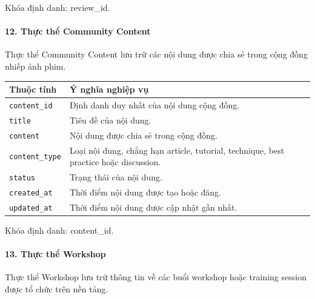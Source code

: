 Khóa định danh: review\_id.

\paragraph{12. Thực thể Community Content}\mbox{}\par

Thực thể Community Content lưu trữ các nội dung được chia sẻ trong cộng đồng nhiếp ảnh phim.

\begin{center}
\scriptsize
\begin{tabular}{p{.25\linewidth} p{.65\linewidth}}
\toprule
Thuộc tính & Ý nghĩa nghiệp vụ \\
\midrule
\texttt{content\_id} & Định danh duy nhất của nội dung cộng đồng. \\
\texttt{title} & Tiêu đề của nội dung. \\
\texttt{content} & Nội dung được chia sẻ trong cộng đồng. \\
\texttt{content\_type} & Loại nội dung, chẳng hạn article, tutorial, technique, best practice hoặc discussion. \\
\texttt{status} & Trạng thái của nội dung. \\
\texttt{created\_at} & Thời điểm nội dung được tạo hoặc đăng. \\
\texttt{updated\_at} & Thời điểm nội dung được cập nhật gần nhất. \\
\bottomrule
\end{tabular}
\end{center}

Khóa định danh: content\_id.

\paragraph{13. Thực thể Workshop}\mbox{}\par

Thực thể Workshop lưu trữ thông tin về các buổi workshop hoặc training session được tổ chức trên nền tảng.

